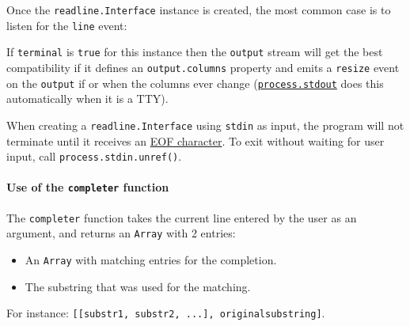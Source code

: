 Once the \texttt{readline.Interface} instance is created, the most
common case is to listen for the
\texttt{\textquotesingle{}line\textquotesingle{}} event:

\begin{Shaded}
\begin{Highlighting}[]
\NormalTok{(}\OperatorTok{,}\KeywordTok{=\textgreater{}}\NormalTok{ \{}
  \NormalTok{(}\SpecialCharTok{$\{}\SpecialCharTok{\}}\VerbatimStringTok{\textasciigrave{}}\NormalTok{)}\OperatorTok{;}
\NormalTok{\})}\OperatorTok{;}
\end{Highlighting}
\end{Shaded}

If \texttt{terminal} is \texttt{true} for this instance then the
\texttt{output} stream will get the best compatibility if it defines an
\texttt{output.columns} property and emits a
\texttt{\textquotesingle{}resize\textquotesingle{}} event on the
\texttt{output} if or when the columns ever change
(\href{process.md\#processstdout}{\texttt{process.stdout}} does this
automatically when it is a TTY).

When creating a \texttt{readline.Interface} using \texttt{stdin} as
input, the program will not terminate until it receives an
\href{https://en.wikipedia.org/wiki/End-of-file\#EOF_character}{EOF
character}. To exit without waiting for user input, call
\texttt{process.stdin.unref()}.

\paragraph{\texorpdfstring{Use of the \texttt{completer}
function}{Use of the completer function}}\label{use-of-the-completer-function-1}

The \texttt{completer} function takes the current line entered by the
user as an argument, and returns an \texttt{Array} with 2 entries:

\begin{itemize}
\tightlist
\item
  An \texttt{Array} with matching entries for the completion.
\item
  The substring that was used for the matching.
\end{itemize}

For instance:
\texttt{{[}{[}substr1,\ substr2,\ ...{]},\ originalsubstring{]}}.

